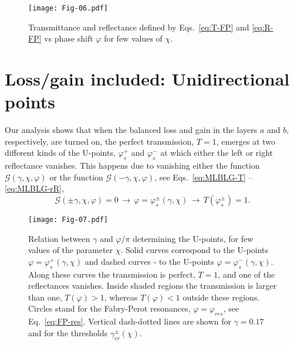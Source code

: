 \documentclass[aps,pra,reprint,showpacs,bibnotes,preprintnumbers,twoside,eqsecnum]{revtex4-1}
\begin{document}
\begin{figure}[!t]
\texttt{[image: Fig-06.pdf]}
\caption{Transmittance and reflectance defined by Eqs.~\eqref{eq:T-FP} and \eqref{eq:R-FP} vs phase shift $\varphi$ for few values of $\chi$.}\label{fig:Fig-06}
\end{figure}

\section{Loss/gain included: Unidirectional points}

Our analysis shows that when the balanced loss and gain in the layers $a$ and $b$, respectively, are turned on, the perfect transmission, $T=1$, emerges at two different kinds of the U-points, $\varphi_s^{+}$ and $\varphi_s^{-}$ at which either the left or right reflectance vanishes. This happens due to vanishing either the function $\mathcal{G(\gamma,\chi,\varphi)}$ or the function $\mathcal{G(-\gamma,\chi,\varphi)}$, see Eqs.~\eqref{eq:MLBLG-T} -- \eqref{eq:MLBLG-rR},
%
\begin{equation}\label{eq:MLBLG-SpRes}
\mathcal{G}(\pm\gamma,\chi,\varphi)=0\,\to\,\varphi=\varphi_s^{\pm}(\gamma,\chi)\,\to\,T(\varphi_s^{\pm})=1.
\end{equation}

\begin{figure}[t]
\centering
\texttt{[image: Fig-07.pdf]}
\caption{Relation between $\gamma$ and $\varphi/\pi$ determining the U-points, for few values of the parameter $\chi$. Solid curves correspond to the U-points $\varphi=\varphi^{+}_s(\gamma,\chi)$ and dashed curves - to the U-points $\varphi=\varphi^{-}_s(\gamma,\chi)$. Along these curves the transmission is perfect, $T=1$, and one of the reflectances vanishes. Inside shaded regions the transmission is larger than one, $T(\varphi)>1$, whereas $T(\varphi)<1$ outside these regions. Circles stand for the Fabry-Perot resonances, $\varphi=\varphi_{res}$, see Eq.~\eqref{eq:FP-res}. Vertical dash-dotted lines are shown for $\gamma=0.17$ and for the thresholds $\gamma_{cr}^{\pm}(\chi)$.}\label{fig:Fig-07}
\end{figure}
\end{document}
